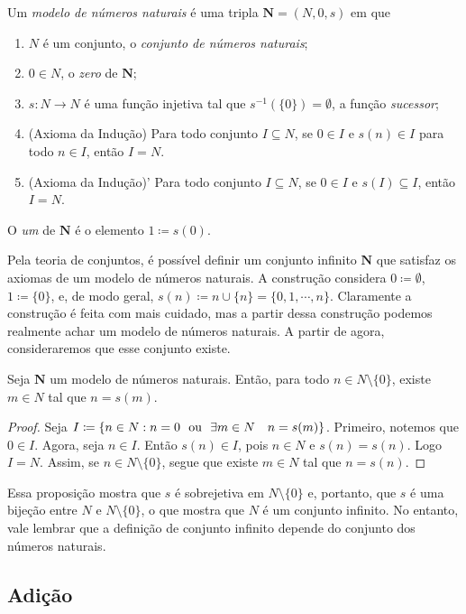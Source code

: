 \begin{defi}
	Um \emph{modelo de números naturais} é uma tripla $\bm N = (N,0,s)$ em que 
	\begin{enumerate}
	\item $N$ é um conjunto, o \emph{conjunto de números naturais};
	\item $0 \in N$, o \emph{zero} de $\bm N$;
	\item $s: N \to N$ é uma função injetiva tal que $s^{-1}(\{0\})=\emptyset$, a função \emph{sucessor};
	\item (Axioma da Indução) Para todo conjunto $I \subseteq N$, se $0 \in I$ e $s(n) \in I$ para todo $n \in I$, então $I=N$.
	\item (Axioma da Indução)' Para todo conjunto $I \subseteq N$, se $0 \in I$ e $s(I) \subseteq I$, então $I=N$.
	\end{enumerate}
	O \emph{um} de $\bm N$ é o elemento $1 \coloneqq s(0)$.
\end{defi}

	Pela teoria de conjuntos, é possível definir um conjunto infinito $\bm N$ que satisfaz os axiomas de um modelo de números naturais. A construção considera $0 \coloneqq \emptyset$, $1 \coloneqq \{0\}$, e, de modo geral, $s(n) \coloneqq n \cup \{n\} = \{0,1,\cdots,n\}$. Claramente a construção é feita com mais cuidado, mas a partir dessa construção podemos realmente achar um modelo de números naturais. A partir de agora, consideraremos que esse conjunto existe.

\begin{prop}
	Seja $\bm N$ um  modelo de números naturais. Então, para todo $n \in N\setminus \{0\}$, existe $m \in N$ tal que $n=s(m)$.
\end{prop}
\begin{proof}
	Seja $I \coloneqq \{n \in N:n=0 \ou \exists m \in N \quad n=s(m)\}$. Primeiro, notemos que $0 \in I$. Agora, seja $n \in I$. Então $s(n) \in I$, pois $n \in N$ e $s(n)=s(n)$. Logo $I=N$. Assim, se $n \in N \setminus \{0\}$, segue que existe $m \in N$ tal que $n=s(n)$.
\end{proof}

Essa proposição mostra que $s$ é sobrejetiva em $N \setminus \{0\}$ e, portanto, que $s$ é uma bijeção entre $N$ e $N \setminus \{0\}$, o que mostra que $N$ é um conjunto infinito. No entanto, vale lembrar que a definição de conjunto infinito depende do conjunto dos números naturais.

\subsection{Adição}

